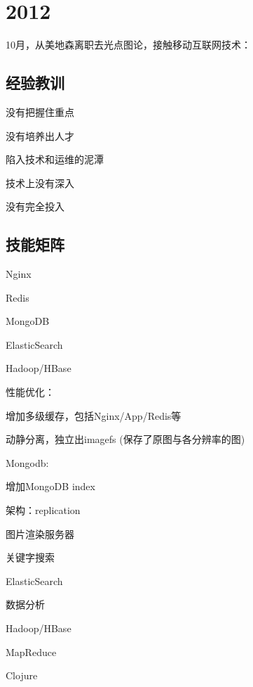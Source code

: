 \chapter{2012}

10月，从美地森离职去光点图论，接触移动互联网技术：

\section{经验教训}

\begin{enumbox}
\item 没有把握住重点
\item 没有培养出人才
\item 陷入技术和运维的泥潭
\item 技术上没有深入
\item 没有完全投入
\end{enumbox}

\section{技能矩阵}

\begin{enumbox}
\item Nginx
\item Redis
\item MongoDB
\item ElasticSearch
\item Hadoop/HBase
\end{enumbox}

性能优化：
\begin{enumbox}
\item 增加多级缓存，包括Nginx/App/Redis等
\item 动静分离，独立出imagefs (保存了原图与各分辨率的图)
\end{enumbox}

Mongodb:
\begin{enumbox}
\item 增加MongoDB index
\item 架构：replication
\item 图片渲染服务器
\end{enumbox}

关键字搜索
\begin{enumbox}
\item ElasticSearch
\end{enumbox}

数据分析
\begin{enumbox}
\item Hadoop/HBase
\item MapReduce
\item Clojure
\end{enumbox}

